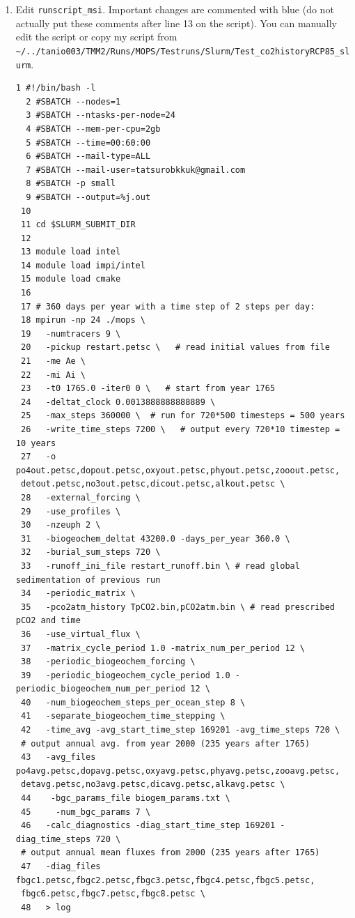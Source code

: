 \documentclass[a4paper]{article}
\begin{document}
\begin{enumerate}
\item Edit \verb|runscript_msi|. Important changes are commented with blue (do not actually put these comments after line 13 on the script). You can manually edit the script or copy my script from \\ \verb|~/../tanio003/TMM2/Runs/MOPS/Testruns/Slurm/Test_co2historyRCP85_slurm|.
\lstset{language=sh} 
\begin{lstlisting}[frame=single,basicstyle=\scriptsize,commentstyle=\color{blue}]
  1 #!/bin/bash -l
  2 #SBATCH --nodes=1
  3 #SBATCH --ntasks-per-node=24
  4 #SBATCH --mem-per-cpu=2gb
  5 #SBATCH --time=00:60:00
  6 #SBATCH --mail-type=ALL
  7 #SBATCH --mail-user=tatsurobkkuk@gmail.com
  8 #SBATCH -p small
  9 #SBATCH --output=%j.out
 10
 11 cd $SLURM_SUBMIT_DIR
 12
 13 module load intel
 14 module load impi/intel
 15 module load cmake
 16
 17 # 360 days per year with a time step of 2 steps per day:
 18 mpirun -np 24 ./mops \
 19   -numtracers 9 \
 20   -pickup restart.petsc \   # read initial values from file
 21   -me Ae \
 22   -mi Ai \
 23   -t0 1765.0 -iter0 0 \   # start from year 1765
 24   -deltat_clock 0.0013888888888889 \   
 25   -max_steps 360000 \  # run for 720*500 timesteps = 500 years
 26   -write_time_steps 7200 \   # output every 720*10 timestep = 10 years
 27   -o po4out.petsc,dopout.petsc,oxyout.petsc,phyout.petsc,zooout.petsc,
 detout.petsc,no3out.petsc,dicout.petsc,alkout.petsc \
 28   -external_forcing \
 29   -use_profiles \
 30   -nzeuph 2 \
 31   -biogeochem_deltat 43200.0 -days_per_year 360.0 \
 32   -burial_sum_steps 720 \
 33   -runoff_ini_file restart_runoff.bin \ # read global sedimentation of previous run
 34   -periodic_matrix \
 35   -pco2atm_history TpCO2.bin,pCO2atm.bin \ # read prescribed pCO2 and time
 36   -use_virtual_flux \
 37   -matrix_cycle_period 1.0 -matrix_num_per_period 12 \
 38   -periodic_biogeochem_forcing \
 39   -periodic_biogeochem_cycle_period 1.0 -periodic_biogeochem_num_per_period 12 \
 40   -num_biogeochem_steps_per_ocean_step 8 \
 41   -separate_biogeochem_time_stepping \
 42   -time_avg -avg_start_time_step 169201 -avg_time_steps 720 \ 
 # output annual avg. from year 2000 (235 years after 1765)
 43   -avg_files po4avg.petsc,dopavg.petsc,oxyavg.petsc,phyavg.petsc,zooavg.petsc,
 detavg.petsc,no3avg.petsc,dicavg.petsc,alkavg.petsc \
 44    -bgc_params_file biogem_params.txt \
 45     -num_bgc_params 7 \
 46   -calc_diagnostics -diag_start_time_step 169201 -diag_time_steps 720 \ 
 # output annual mean fluxes from 2000 (235 years after 1765)
 47   -diag_files fbgc1.petsc,fbgc2.petsc,fbgc3.petsc,fbgc4.petsc,fbgc5.petsc,
 fbgc6.petsc,fbgc7.petsc,fbgc8.petsc \
 48   > log
\end{lstlisting}


\end{enumerate}
\end{document}
